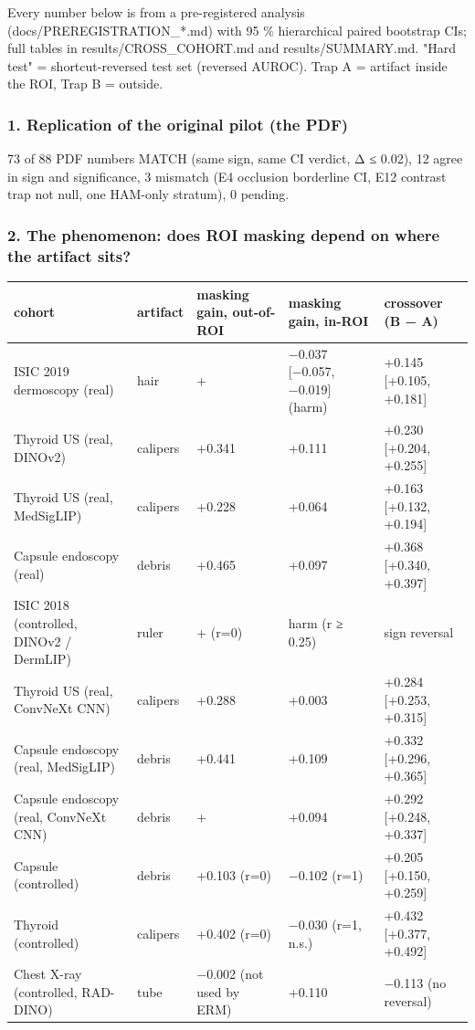 {\small
Every number below is from a pre-registered analysis (docs/PREREGISTRATION\_*.md) with 95 \% hierarchical paired
bootstrap CIs; full tables in results/CROSS\_COHORT.md and results/SUMMARY.md. "Hard test" = shortcut-reversed
test set (reversed AUROC). Trap A = artifact inside the ROI, Trap B = outside.

\subsubsection{1. Replication of the original pilot (the PDF)}\label{1-replication-of-the-original-pilot-the-pdf}

73 of 88 PDF numbers MATCH (same sign, same CI verdict, \textbar Δ\textbar{} ≤ 0.02), 12 agree in sign and significance,
3 mismatch (E4 occlusion borderline CI, E12 contrast trap not null, one HAM-only stratum), 0 pending.

\subsubsection{2. The phenomenon: does ROI masking depend on where the artifact sits?}\label{2-the-phenomenon-does-roi-masking-depend-on-where-the-artifact-sits}

{ %
\begin{longtable}[]{@{}lllll@{}}
\toprule\noalign{}
cohort & artifact & masking gain, out-of-ROI & masking gain, in-ROI & crossover (B − A) \\
\midrule\noalign{}
\endhead
\bottomrule\noalign{}
\endlastfoot
ISIC 2019 dermoscopy (real) & hair & + & −0.037 {[}−0.057, −0.019{]} (harm) & +0.145 {[}+0.105, +0.181{]} \\
Thyroid US (real, DINOv2) & calipers & +0.341 & +0.111 & +0.230 {[}+0.204, +0.255{]} \\
Thyroid US (real, MedSigLIP) & calipers & +0.228 & +0.064 & +0.163 {[}+0.132, +0.194{]} \\
Capsule endoscopy (real) & debris & +0.465 & +0.097 & +0.368 {[}+0.340, +0.397{]} \\
ISIC 2018 (controlled, DINOv2 / DermLIP) & ruler & + (r=0) & harm (r ≥ 0.25) & sign reversal \\
Thyroid US (real, ConvNeXt CNN) & calipers & +0.288 & +0.003 & +0.284 {[}+0.253, +0.315{]} \\
Capsule endoscopy (real, MedSigLIP) & debris & +0.441 & +0.109 & +0.332 {[}+0.296, +0.365{]} \\
Capsule endoscopy (real, ConvNeXt CNN) & debris & + & +0.094 & +0.292 {[}+0.248, +0.337{]} \\
Capsule (controlled) & debris & +0.103 (r=0) & −0.102 (r=1) & +0.205 {[}+0.150, +0.259{]} \\
Thyroid (controlled) & calipers & +0.402 (r=0) & −0.030 (r=1, n.s.) & +0.432 {[}+0.377, +0.492{]} \\
Chest X-ray (controlled, RAD-DINO) & tube & −0.002 (not used by ERM) & +0.110 & −0.113 (no reversal) \\
\end{longtable}
}

}
